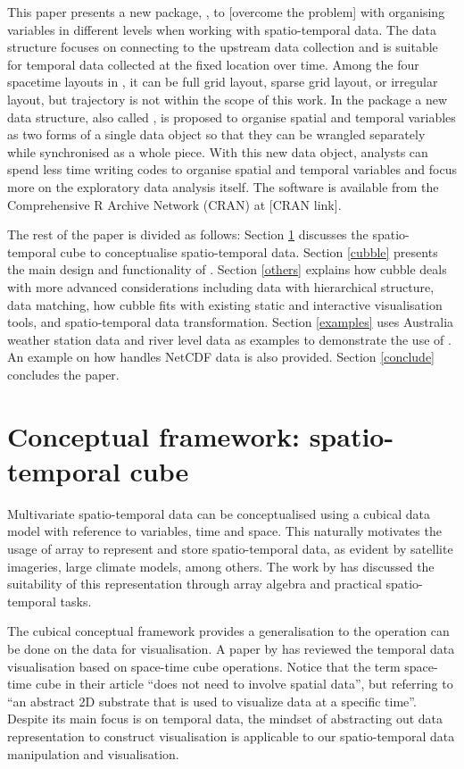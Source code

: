 \documentclass[
]{jss}
\begin{document}
This paper presents a new  package, , to {[}overcome the problem{]} with organising variables in different levels when working with spatio-temporal data. The data structure focuses on connecting to the upstream data collection and is suitable for temporal data collected at the fixed location over time. Among the four spacetime layouts in \citet{spacetime}, it can be full grid layout, sparse grid layout, or irregular layout, but trajectory is not within the scope of this work. In the package a new data structure, also called , is proposed to organise spatial and temporal variables as two forms of a single data object so that they can be wrangled separately while synchronised as a whole piece. With this new data object, analysts can spend less time writing codes to organise spatial and temporal variables and focus more on the exploratory data analysis itself. The software is available from the Comprehensive R Archive Network (CRAN) at {[}CRAN link{]}.

The rest of the paper is divided as follows: Section \ref{cube} discusses the spatio-temporal cube to conceptualise spatio-temporal data. Section \ref{cubble} presents the main design and functionality of . Section \ref{others} explains how cubble deals with more advanced considerations including data with hierarchical structure, data matching, how cubble fits with existing static and interactive visualisation tools, and spatio-temporal data transformation. Section \ref{examples} uses Australia weather station data and river level data as examples to demonstrate the use of . An example on how  handles NetCDF data is also provided. Section \ref{conclude} concludes the paper.

\hypertarget{cube}{%
\section{Conceptual framework: spatio-temporal cube}\label{cube}}

Multivariate spatio-temporal data can be conceptualised using a cubical data model with reference to variables, time and space. This naturally motivates the usage of array to represent and store spatio-temporal data, as evident by satellite imageries, large climate models, among others. The work by \citet{lu_multidimensional_2018} has discussed the suitability of this representation through array algebra and practical spatio-temporal tasks.

The cubical conceptual framework provides a generalisation to the operation can be done on the data for visualisation. A paper by \citet{bach_review_2014} has reviewed the temporal data visualisation based on space-time cube operations. Notice that the term space-time cube in their article ``does not need to involve spatial data'', but referring to ``an abstract 2D substrate that is used to visualize data at a specific time''. Despite its main focus is on temporal data, the mindset of abstracting out data representation to construct visualisation is applicable to our spatio-temporal data manipulation and visualisation.
\end{document}
